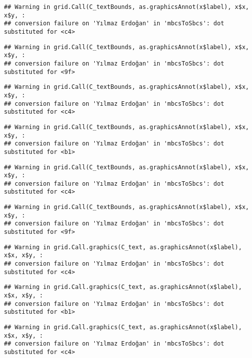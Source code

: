\documentclass[
]{article}
\begin{document}
\begin{verbatim}
## Warning in grid.Call(C_textBounds, as.graphicsAnnot(x$label), x$x, x$y, :
## conversion failure on 'Yılmaz Erdoğan' in 'mbcsToSbcs': dot substituted for <c4>
\end{verbatim}

\begin{verbatim}
## Warning in grid.Call(C_textBounds, as.graphicsAnnot(x$label), x$x, x$y, :
## conversion failure on 'Yılmaz Erdoğan' in 'mbcsToSbcs': dot substituted for <9f>
\end{verbatim}

\begin{verbatim}
## Warning in grid.Call(C_textBounds, as.graphicsAnnot(x$label), x$x, x$y, :
## conversion failure on 'Yılmaz Erdoğan' in 'mbcsToSbcs': dot substituted for <c4>
\end{verbatim}

\begin{verbatim}
## Warning in grid.Call(C_textBounds, as.graphicsAnnot(x$label), x$x, x$y, :
## conversion failure on 'Yılmaz Erdoğan' in 'mbcsToSbcs': dot substituted for <b1>
\end{verbatim}

\begin{verbatim}
## Warning in grid.Call(C_textBounds, as.graphicsAnnot(x$label), x$x, x$y, :
## conversion failure on 'Yılmaz Erdoğan' in 'mbcsToSbcs': dot substituted for <c4>
\end{verbatim}

\begin{verbatim}
## Warning in grid.Call(C_textBounds, as.graphicsAnnot(x$label), x$x, x$y, :
## conversion failure on 'Yılmaz Erdoğan' in 'mbcsToSbcs': dot substituted for <9f>
\end{verbatim}

\begin{verbatim}
## Warning in grid.Call.graphics(C_text, as.graphicsAnnot(x$label), x$x, x$y, :
## conversion failure on 'Yılmaz Erdoğan' in 'mbcsToSbcs': dot substituted for <c4>
\end{verbatim}

\begin{verbatim}
## Warning in grid.Call.graphics(C_text, as.graphicsAnnot(x$label), x$x, x$y, :
## conversion failure on 'Yılmaz Erdoğan' in 'mbcsToSbcs': dot substituted for <b1>
\end{verbatim}

\begin{verbatim}
## Warning in grid.Call.graphics(C_text, as.graphicsAnnot(x$label), x$x, x$y, :
## conversion failure on 'Yılmaz Erdoğan' in 'mbcsToSbcs': dot substituted for <c4>
\end{verbatim}
\end{document}
